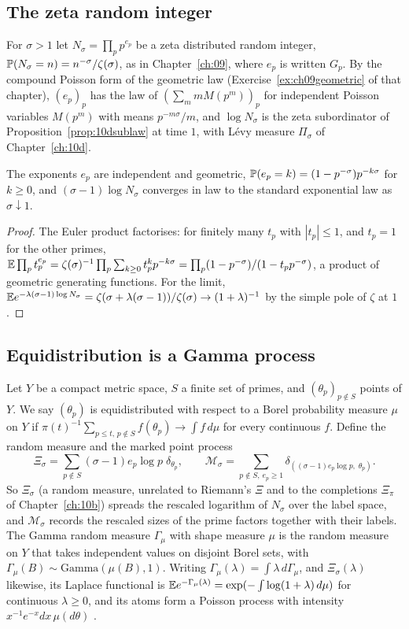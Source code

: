 \subsection{The zeta random integer}

For $\sigma>1$ let $N_\sigma=\prod_pp^{e_p}$ be a zeta distributed random integer, $\mathbb{P}(N_\sigma=n)=n^{-\sigma}/\zeta(\sigma)$, as in Chapter~\ref{ch:09}, where $e_p$ is written $G_p$. By the compound Poisson form of the geometric law (Exercise~\ref{ex:ch09geometric} of that chapter), $(e_p)_p$ has the law of $(\sum_mmM(p^m))_p$ for independent Poisson variables $M(p^m)$ with means $p^{-m\sigma}/m$, and $\log N_\sigma$ is the zeta subordinator of Proposition~\ref{prop:10dsublaw} at time $1$, with L\'evy measure $\Pi_\sigma$ of Chapter~\ref{ch:10d}.

\begin{lemma}\label{lem:recipzeta}
The exponents $e_p$ are independent and geometric, $\mathbb{P}(e_p=k)=(1-p^{-\sigma})p^{-k\sigma}$ for $k\ge0$, and $(\sigma-1)\log N_\sigma$ converges in law to the standard exponential law as $\sigma\downarrow1$.
\end{lemma}

\begin{proof}
The Euler product factorises: for finitely many $t_p$ with $|t_p|\le1$, and $t_p=1$ for the other primes, $\mathbb{E}\prod_pt_p^{e_p}=\zeta(\sigma)^{-1}\prod_p\sum_{k\ge0}t_p^kp^{-k\sigma}=\prod_p(1-p^{-\sigma})/(1-t_pp^{-\sigma})$, a product of geometric generating functions. For the limit, $\mathbb{E} e^{-\lambda(\sigma-1)\log N_\sigma}=\zeta(\sigma+\lambda(\sigma-1))/\zeta(\sigma)\to(1+\lambda)^{-1}$ by the simple pole of $\zeta$ at $1$.
\end{proof}

\subsection{Equidistribution is a Gamma process}

Let $Y$ be a compact metric space, $S$ a finite set of primes, and $(\theta_p)_{p\notin S}$ points of $Y$. We say $(\theta_p)$ is equidistributed with respect to a Borel probability measure $\mu$ on $Y$ if $\pi(t)^{-1}\sum_{p\le t,\,p\notin S}f(\theta_p)\to\int f\,d\mu$ for every continuous $f$. Define the random measure and the marked point process
\[
\Xi_\sigma=\sum_{p\notin S}(\sigma-1)e_p\log p\;\delta_{\theta_p},\qquad \mathcal M_\sigma=\sum_{p\notin S,\,e_p\ge1}\delta_{((\sigma-1)e_p\log p,\;\theta_p)} .
\]
So $\Xi_\sigma$ (a random measure, unrelated to Riemann's $\Xi$ and to the completions $\Xi_\pi$ of Chapter~\ref{ch:10b}) spreads the rescaled logarithm of $N_\sigma$ over the label space, and $\mathcal M_\sigma$ records the rescaled sizes of the prime factors together with their labels. The Gamma random measure $\Gamma_\mu$ with shape measure $\mu$ is the random measure on $Y$ that takes independent values on disjoint Borel sets, with $\Gamma_\mu(B)\sim\mathrm{Gamma}(\mu(B),1)$. Writing $\Gamma_\mu(\lambda)=\int\lambda\,d\Gamma_\mu$, and $\Xi_\sigma(\lambda)$ likewise, its Laplace functional is $\mathbb{E} e^{-\Gamma_\mu(\lambda)}=\exp(-\int\log(1+\lambda)\,d\mu)$ for continuous $\lambda\ge0$, and its atoms form a Poisson process with intensity $x^{-1}e^{-x}dx\,\mu(d\theta)$ \cite{kingman1993}.

